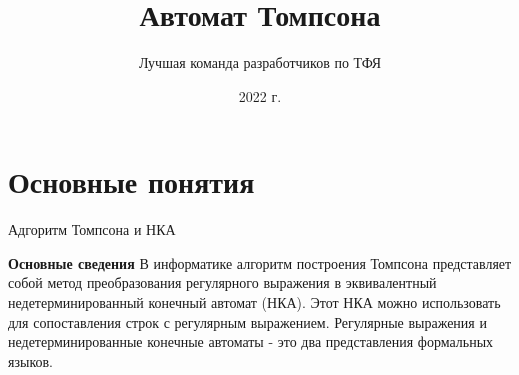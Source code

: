 \documentclass[mathserif]{beamer}
\title[] {Автомат Томпсона}
\author[Chipollino]{Лучшая команда разработчиков по ТФЯ} %
\date[] 
{2022 г.}
\begin{document}
\maketitle
\section{Основные понятия}
\begin{frame}{Адгоритм Томпсона и НКА}
    \vspace{-5pt}
    \begin{block}{\bf Основные сведения}
        В информатике алгоритм построения Томпсона представляет собой метод преобразования регулярного выражения в эквивалентный недетерминированный конечный автомат (НКА). Этот НКА можно использовать для сопоставления строк с регулярным выражением.
        Регулярные выражения и недетерминированные конечные автоматы - это два представления формальных языков.
    \end{block}
\end{frame}%
\end{document}
